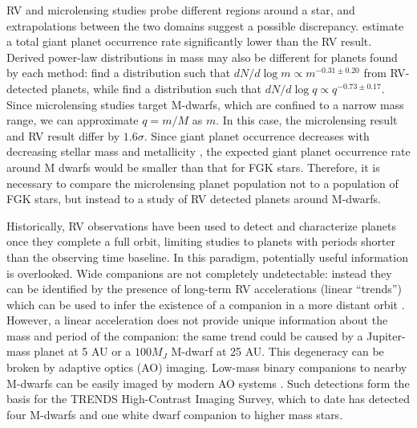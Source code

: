 RV and microlensing studies probe different regions around a star, and extrapolations between the two domains suggest a possible discrepancy. \citet{Cassan12} estimate a total giant planet occurrence rate significantly lower than the \citet{Cumming08} RV result.
Derived power-law distributions in mass may also be different for planets found by each method: \citet{Cumming08} find a distribution such that $dN/d \log m \propto m^{-0.31 \pm 0.20}$ from RV-detected planets, while \citet{Cassan12} find a distribution such that $dN/ d\log q \propto q^{-0.73 \pm 0.17}$. Since microlensing studies target M-dwarfs, which are confined to a narrow mass range, we can approximate $q = m/M$ as $m$. In this case, the microlensing result and RV result differ by $1.6 \sigma$.  Since giant planet occurrence decreases with decreasing stellar mass and metallicity \citep{Johnson10a}, the expected giant planet occurrence rate around M dwarfs would be smaller than that for FGK stars. Therefore, it is necessary to compare the microlensing planet population not to a population of FGK stars, but instead to a study of RV detected planets around M-dwarfs.

Historically, RV observations have been used to detect and characterize planets once they complete a full orbit, limiting studies to planets with periods shorter than the observing time baseline. In this paradigm, potentially useful information is overlooked. Wide companions are not completely undetectable: instead they can be identified by the presence of long-term RV accelerations (linear ``trends'')  which can be used to infer the existence of a companion in a more distant orbit \citep{Liu02, Crepp12a}. However, a linear acceleration does not provide unique information about the mass and period of the companion: the same trend could be caused by a Jupiter-mass planet at 5 AU or a $100 M_J$ M-dwarf at 25 AU. This degeneracy can be broken by adaptive optics (AO) imaging. Low-mass binary companions to nearby M-dwarfs can be easily imaged by modern AO systems \citep{Lloyd02, Siegler03}. Such detections form the basis for the TRENDS High-Contrast Imaging Survey, which to date has detected four M-dwarfs and one white dwarf companion to higher mass stars\citep{Crepp12b, Crepp13a, Crepp13b}.

